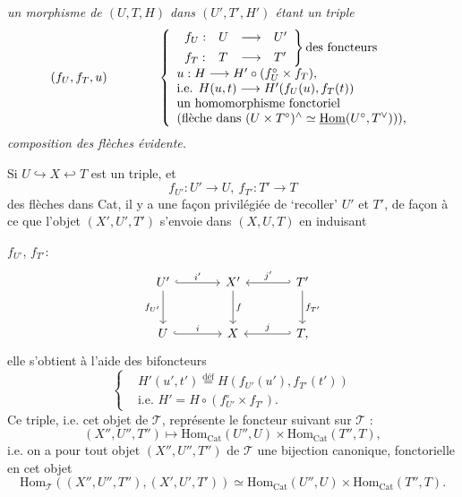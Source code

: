 \textit{un morphisme de $(U,T,H)$ dans $(U',T',H')$ étant un triple}
\[
(f_U, f_T, u) \qquad\qquad
\left\{\begin{array}{l}
\left.\begin{array}{llll}
f_U : & U & \longrightarrow & U' \\[1ex]
f_T : & T & \longrightarrow & T'
\end{array}\right\}\text{des foncteurs}\\[2ex]
u : H \longrightarrow H' \circ (f_U^\circ \times f_T),\\
\text{i.e. } H(u,t) \longrightarrow H'(f_U(u), f_T(t))\\
\text{un homomorphisme fonctoriel}\\
\text{(flèche dans } (U \times T^\circ)^\wedge \simeq \underline{\mathrm{Hom}}(U^\circ,T^\vee)\text{)),}
\end{array}\right.
\]
\textit{composition des flèches évidente.}

Si $U \hookrightarrow X \hookleftarrow T$ est un triple, et
\[
f_{U'} : U' \longrightarrow U,\ f_{T'} : T' \longrightarrow T
\]
des flèches dans Cat, il y a une façon privilégiée de `recoller' $U'$ et $T'$, de façon à ce que l'objet $(X',U',T')$ s'envoie dans $(X,U,T)$ en induisant


$f_{U'}$, $f_{T'}$:
\[
\begin{tikzcd}[column sep=large, row sep=large]
U' \arrow[r, hook, "i'"] \arrow[d, "f_{U'}"'] & X' \arrow[d, "f"] & T' \arrow[l, hook', "j'"'] \arrow[d, "f_{T'}"] \\
U \arrow[r, hook, "i"] & X & T, \arrow[l, hook', "j"']
\end{tikzcd}
\]
elle s'obtient à l'aide des bifoncteurs
\[
\left\{\begin{aligned}
&H'(u',t') \overset{\text{déf}}{=} H(f_{U'}(u'), f_{T'}(t'))\\
&\text{i.e. } H' = H \circ (f_{U'}^\circ \times f_{T'}).
\end{aligned}\right.
\]
Ce triple, i.e. cet objet de $\mathcal{T}$, représente le foncteur suivant sur $\mathcal{T}$ :
\[
(X'',U'',T'') \longmapsto \mathrm{Hom}_{\mathrm{Cat}}(U'',U) \times \mathrm{Hom}_{\mathrm{Cat}}(T'',T),
\]
i.e. on a pour tout objet $(X'',U'',T'')$ de $\mathcal{T}$ une bijection canonique, fonctorielle en cet objet
\[
\mathrm{Hom}_{\mathcal{T}}((X'',U'',T''),(X',U',T')) \simeq \mathrm{Hom}_{\mathrm{Cat}}(U'',U) \times \mathrm{Hom}_{\mathrm{Cat}}(T'',T). \tag*{$(*)$}
\]


